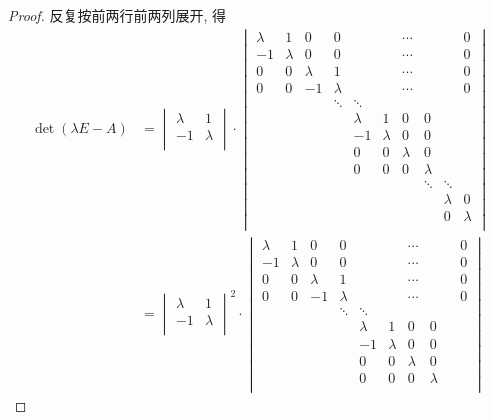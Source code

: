 \documentclass[color=black,device=normal,lang=cn,mode=geye]{elegantnote}
\begin{document}
\begin{proof}
    反复按前两行前两列展开, 得
    \begin{align*}
        \det(\lambda E-A) & =\begin{vmatrix}
            \lambda  & 1 \\
            -1 & \lambda \\
        \end{vmatrix}\cdot\begin{vmatrix}
            \lambda  & 1 & 0  & 0 &&& \cdots &&& 0 \\
            -1 & \lambda & 0  & 0 &&& \cdots &&& 0 \\
            0  & 0 & \lambda  & 1 &&& \cdots &&& 0 \\
            0  & 0 & -1 & \lambda &&& \cdots &&& 0 \\
            &&& \ddots & \ddots \\
            &&&& \lambda  & 1 & 0 & 0 \\
            &&&& -1 & \lambda & 0 & 0 \\
            &&&& 0  & 0 & \lambda & 0 \\
            &&&& 0  & 0 & 0 & \lambda \\
            &&&&&&& \ddots & \ddots \\
            &&&&&&&& \lambda & 0 \\
            &&&&&&&& 0 & \lambda \\
        \end{vmatrix} \\
        & =\begin{vmatrix}
            \lambda  & 1 \\
            -1 & \lambda \\
        \end{vmatrix}^2\cdot\begin{vmatrix}
            \lambda  & 1 & 0  & 0 &&& \cdots &&& 0 \\
            -1 & \lambda & 0  & 0 &&& \cdots &&& 0 \\
            0  & 0 & \lambda  & 1 &&& \cdots &&& 0 \\
            0  & 0 & -1 & \lambda &&& \cdots &&& 0 \\
            &&& \ddots & \ddots \\
            &&&& \lambda  & 1 & 0 & 0 \\
            &&&& -1 & \lambda & 0 & 0 \\
            &&&& 0  & 0 & \lambda & 0 \\
            &&&& 0  & 0 & 0 & \lambda \\

\end{vmatrix}
\end{align*}
\end{proof}
\end{document}

